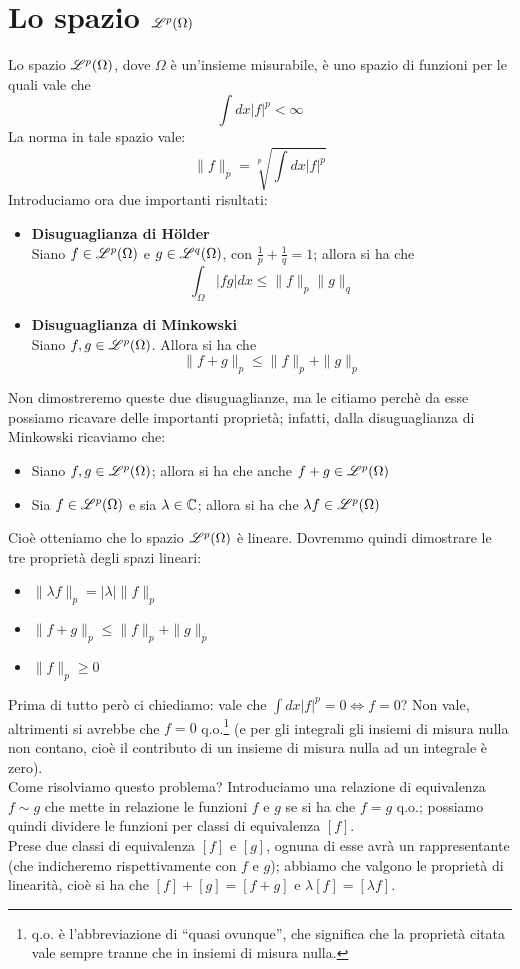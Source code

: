 \section{Lo spazio $\mathscr{L}^p (\Omega)$}

Lo spazio  $\mathscr{L}^p (\Omega)$, dove $\Omega$ è un'insieme misurabile, è uno spazio di funzioni per le quali vale che
$$\int dx |f|^p < \infty$$
La norma in tale spazio vale:
$$\|f\| _p=\sqrt[p]{\int dx |f|^p}$$
Introduciamo ora due importanti risultati:
\begin{itemize}
\item \textbf{Disuguaglianza di H\"{o}lder} \\Siano $f \in \mathscr{L}^p (\Omega)$ e $g \in \mathscr{L}^q (\Omega)$, con $\frac{1}{p} + \frac{1}{q} =1$; allora si ha che \\$$\int_{\Omega} |fg|dx \leq \|f\|_p \|g\|_q$$
\item \textbf{Disuguaglianza di Minkowski} \\Siano $f, g \in  \mathscr{L}^p (\Omega)$. Allora si ha che \\$$\|f+g\|_p \leq \|f\|_p + \|g\|_p$$
\end{itemize}
Non dimostreremo queste due disuguaglianze, ma le citiamo perchè da esse possiamo ricavare delle importanti proprietà; infatti, dalla disuguaglianza di Minkowski ricaviamo che:
\begin{itemize}
\item Siano $f,g \in \mathscr{L}^p (\Omega)$; allora si ha che anche $f+g \in \mathscr{L}^p (\Omega)$
\item Sia $f \in \mathscr{L}^p (\Omega)$ e sia $\lambda \in \mathbb{C}$; allora si ha che $\lambda f \in \mathscr{L}^p (\Omega)$
\end{itemize}
Cioè otteniamo che lo spazio $\mathscr{L}^p (\Omega)$ è lineare.
Dovremmo quindi dimostrare le tre proprietà degli spazi lineari:
\begin{itemize}
\item $\| \lambda f\|_p=|\lambda| \|f\|_p$
\item $\|f+g\|_p \leq \|f\|_p + \|g\|_p$
\item $\|f\|_p \geq 0$
\end{itemize}
Prima di tutto però ci chiediamo: vale che $\int dx |f|^p =0 \iff f=0$? Non vale, altrimenti si avrebbe che $f=0$ q.o.\footnote{q.o. è l'abbreviazione di ``quasi ovunque'', che significa che la proprietà citata vale sempre tranne che in insiemi di misura nulla.} (e per gli integrali gli insiemi di misura nulla non contano, cioè il contributo di un insieme di misura nulla ad un integrale è zero). \\Come risolviamo questo problema? Introduciamo una relazione di equivalenza $f \sim g$ che mette in relazione le funzioni $f$ e $g$ se si ha che $f=g$ q.o.; possiamo quindi dividere le funzioni per classi di equivalenza $[f]$. \\Prese due classi di equivalenza $[f]$ e $[g]$, ognuna di esse avrà un rappresentante (che indicheremo rispettivamente con $f$ e $g$); abbiamo che valgono le proprietà di linearità, cioè si ha che $[f]+[g]=[f+g]$ e $\lambda [f]=[\lambda f ]$.

